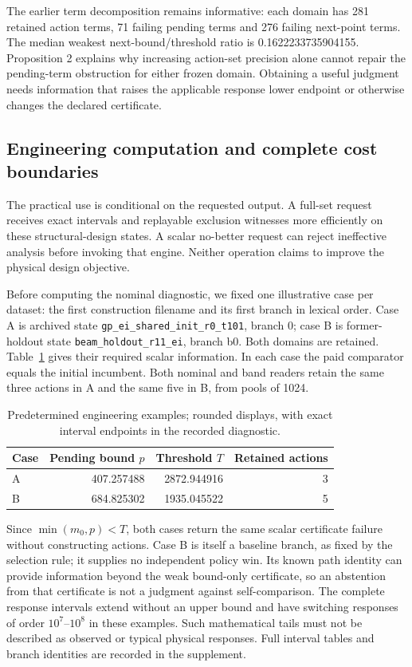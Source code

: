 \documentclass[]{interact}
\begin{document}
The earlier term decomposition remains informative: each domain has 281 retained action terms, 71 failing pending terms and 276 failing next-point terms. The median weakest next-bound/threshold ratio is 0.1622233735904155. Proposition 2 explains why increasing action-set precision alone cannot repair the pending-term obstruction for either frozen domain. Obtaining a useful judgment needs information that raises the applicable response lower endpoint or otherwise changes the declared certificate.

\subsection{Engineering computation and complete cost boundaries}

The practical use is conditional on the requested output. A full-set request receives exact intervals and replayable exclusion witnesses more efficiently on these structural-design states. A scalar no-better request can reject ineffective analysis before invoking that engine. Neither operation claims to improve the physical design objective.

Before computing the nominal diagnostic, we fixed one illustrative case per dataset: the first construction filename and its first branch in lexical order. Case A is archived state \texttt{gp\_ei\_shared\_init\_r0\_t101}, branch 0; case B is former-holdout state \texttt{beam\_holdout\_r11\_ei}, branch b0. Both domains are retained. Table~\ref{tab:engineering_examples} gives their required scalar information. In each case the paid comparator equals the initial incumbent. Both nominal and band readers retain the same three actions in A and the same five in B, from pools of 1024.

\begin{table}[htbp]\centering\small
\caption{Predetermined engineering examples; rounded displays, with exact interval endpoints in the recorded diagnostic.}\label{tab:engineering_examples}
\begin{tabular}{lrrr}\toprule
Case & Pending bound $p$ & Threshold $T$ & Retained actions\\\midrule
A & 407.257488 & 2872.944916 & 3\\
B & 684.825302 & 1935.045522 & 5\\\bottomrule
\end{tabular}\end{table}

Since $\min(m_0,p)<T$, both cases return the same scalar certificate failure without constructing actions. Case B is itself a baseline branch, as fixed by the selection rule; it supplies no independent policy win. Its known path identity can provide information beyond the weak bound-only certificate, so an abstention from that certificate is not a judgment against self-comparison. The complete response intervals extend without an upper bound and have switching responses of order $10^7$--$10^8$ in these examples. Such mathematical tails must not be described as observed or typical physical responses. Full interval tables and branch identities are recorded in the supplement.
\end{document}
